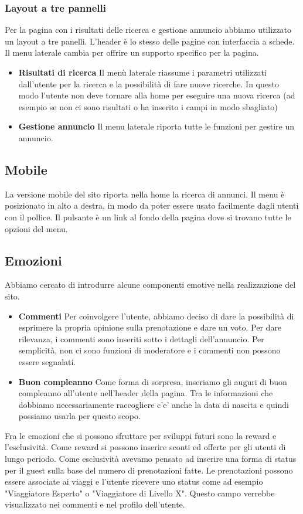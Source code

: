 \documentclass[1_relazione.tex]{subfiles}
\begin{document}
\subsubsection{Layout a tre pannelli} 
Per la pagina con i risultati delle ricerca e gestione annuncio abbiamo utilizzato un layout a tre panelli. L'header è lo stesso delle pagine con interfaccia a schede. Il menu laterale cambia per offrire un supporto specifico per la pagina.

\begin{itemize}
\item \textbf{Risultati di ricerca} Il menù laterale riassume i parametri utilizzati dall'utente per la ricerca e la possibilità di fare nuove ricerche. In questo modo l'utente non deve tornare alla home per eseguire una nuova ricerca (ad esempio se non ci sono risultati o ha inserito i campi in modo sbagliato) 
\item \textbf{Gestione annuncio} Il menu laterale riporta tutte le funzioni per gestire un annuncio. 
\end{itemize}

\subsection{Mobile}
La versione mobile del sito riporta nella home la ricerca di annunci. Il menu è posizionato in alto a destra, in modo da poter essere usato facilmente dagli utenti con il pollice. Il pulsante è un link al fondo della pagina dove si trovano tutte le opzioni del menu.

\subsection{Emozioni}
Abbiamo cercato di introdurre alcune componenti emotive nella realizzazione del sito.

\begin{itemize}
\item \textbf{Commenti} Per coinvolgere l'utente, abbiamo deciso di dare la possibilità di esprimere la propria opinione sulla prenotazione e dare un voto. Per dare rilevanza, i commenti sono inseriti sotto i dettagli dell'annuncio. Per semplicità, non ci sono funzioni di moderatore e i commenti non possono essere segnalati. 

\item \textbf{Buon compleanno} Come forma di sorpresa, inseriamo gli auguri di buon compleanno all'utente nell'header della pagina. Tra le informazioni che dobbiamo necessariamente raccogliere c'e' anche la data di nascita e quindi possiamo usarla per questo scopo.  
\end{itemize}

Fra le emozioni che si possono sfruttare per sviluppi futuri sono la reward e l'esclusività. Come reward si possono inserire sconti ed offerte per gli utenti di lungo periodo. Come esclusività avevamo pensato ad inserire una forma di status per il guest sulla base del numero di prenotazioni fatte. Le prenotazioni possono essere associate ai viaggi e l'utente ricevere uno status come ad esempio "Viaggiatore Esperto" o "Viaggiatore di Livello X". Questo campo verrebbe visualizzato nei commenti e nel profilo dell'utente. 
\end{document}
